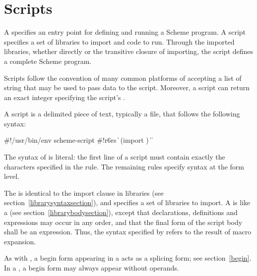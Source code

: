 \chapter{Scripts}
\label{scriptchapter}

A  specifies an entry point for defining and running
a Scheme program.  A script specifies a set of libraries to import and
code to run.  Through the imported libraries, whether directly or the
transitive closure of importing, the script defines a complete Scheme
program.

Scripts follow the convention of many common platforms of accepting a
list of string  that may be used to
pass data to the script.  Moreover, a script can return an exact
integer specifying the script's .

A script is a delimited piece of text, typically a file, that follows
the following syntax:

\begin{grammar}
 \: \#!/usr/bin/env scheme-script
  \> 
  \> 
 \: \#!r6rs  
  \> \|  
 \: (import )
 \:  
 \: 
\> \| 
\> \| 
\end{grammar}

The syntax of  is literal: the first line of a
script must contain exactly the characters specified in the rule.  The
remaining rules specify syntax at the form level.  

The  is identical to the import clause in
libraries (see section~\ref{librarysyntaxsection}), 
and specifies a set of libraries to import.  A  is like a  (see
section~\ref{librarybodysection}), except that declarations,
definitions and expressions may occur in any order, and that the final
form of the script body shall be an expression.  Thus, the syntax
specified by  refers to the result of macro
expansion.

As with , a {\cf begin} form appearing in a
 acts as a splicing form; see section~\ref{begin}.
In a , a {\cf begin} form may always appear without
operands.

